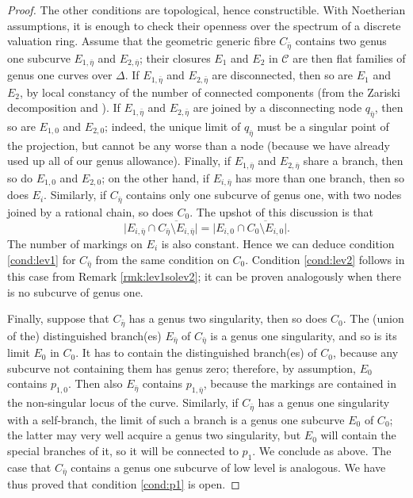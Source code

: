 \documentclass[11pt]{amsart}
\newcommand{\dvr}{\Delta}
\theoremstyle{plain}
\theoremstyle{definition}
\begin{document}
\begin{proof}
 The other conditions are topological, hence constructible. With Noetherian assumptions, it is enough to check their openness over the spectrum of a discrete valuation ring. Assume that the geometric generic fibre $C_{\bar\eta}$ contains two genus one subcurve $E_{1,\bar\eta}$ and $E_{2,\bar\eta}$; their closures $E_1$ and $E_2$ in $\mathcal C$ are then flat families of genus one curves over $\dvr$. If $E_{1,\bar\eta}$ and $E_{2,\bar\eta}$ are disconnected, then so are $E_1$ and $E_2$, by local constancy of the number of connected components (from the Zariski decomposition and \cite[\href{https://stacks.math.columbia.edu/tag/0E0D}{Tag 0E0D}]{stacks-project}). If $E_{1,\bar\eta}$ and $E_{2,\bar\eta}$ are joined by a disconnecting node $q_{\bar\eta}$, then so are $E_{1,0}$ and $E_{2,0}$; indeed, the unique limit of $q_{\bar\eta}$ must be a singular point of the projection, but cannot be any worse than a node (because we have already used up all of our genus allowance). Finally, if $E_{1,\bar\eta}$ and $E_{2,\bar\eta}$ share a branch, then so do $E_{1,0}$ and $E_{2,0}$; on the other hand, if $E_{i,\bar\eta}$ has more than one branch, then so does $E_i$. Similarly, if $C_{\bar\eta}$ contains only one subcurve of genus one, with two nodes joined by a rational chain, so does $C_0$. The upshot of this discussion is that
 \[\lvert E_{i,\bar\eta}\cap\overline{C_{\bar\eta}\setminus E_{i,\bar\eta}}\rvert=\lvert E_{i,0}\cap\overline{C_{0}\setminus E_{i,0}}\rvert.\]
 The number of markings on $E_i$ is also constant. Hence we can deduce condition \eqref{cond:lev1} for $C_{\bar\eta}$ from the same condition on $C_0$. Condition \eqref{cond:lev2} follows in this case from Remark \ref{rmk:lev1solev2}; it can be proven analogously when there is no subcurve of genus one.
 
 Finally, suppose that $C_{\bar\eta}$ has a genus two singularity, then so does $C_0$. The (union of the) distinguished branch(es) $E_{\bar\eta}$ of $C_{\bar\eta}$ is a genus one singularity, and so is its limit $E_0$ in $C_0$. It has to contain the distinguished branch(es) of $C_0$, because any subcurve not containing them has genus zero; therefore, by assumption, $E_0$ contains $p_{1,0}$. Then also $E_{\bar\eta}$ contains $p_{1,\bar\eta}$, because the markings are contained in the non-singular locus of the curve. Similarly, if $C_{\bar\eta}$ has a genus one singularity with a self-branch, the limit of such a branch is a genus one subcurve $E_0$ of $C_0$; the latter may very well acquire a genus two singularity, but $E_0$ will contain the special branches of it, so it will be connected to $p_1$. We conclude as above. The case that $C_{\bar\eta}$ contains a genus one subcurve of low level is analogous. We have thus proved that condition \eqref{cond:p1} is open.
\end{proof}
\end{document}
